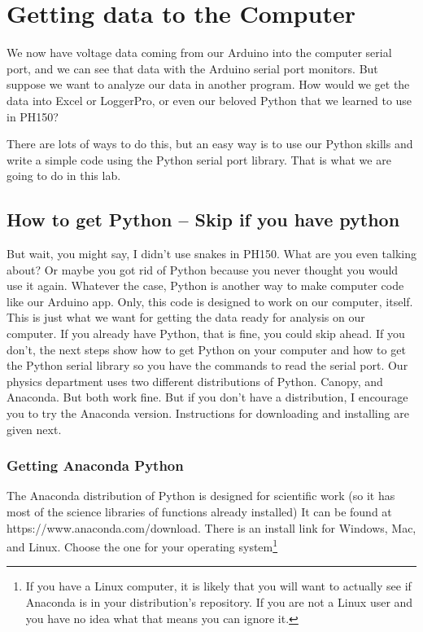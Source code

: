 \chapter{Getting data to the Computer}
We now have voltage data coming from our Arduino into the computer serial port, and we can see that data with the Arduino serial port monitors. But suppose we want to analyze our data in another program. How would we get the data into Excel or LoggerPro, or even our beloved Python that we learned to use in PH150?

There are lots of ways to do this, but an easy way is to use our Python skills and write a simple code using the Python serial port library. That is what we are going to do in this lab.

\section{How to get Python -- Skip if you have python}

But wait, you might say, I didn't use snakes in PH150. What are you even talking about? Or maybe you got rid of Python because you never thought you would use it again. Whatever the case, Python is another way to make computer code like our Arduino app. Only, this code is designed to work on our computer, itself. This is just what we want for getting the data ready for analysis on our computer. If you already have Python, that is fine, you could skip ahead. If you don't, the next steps show how to get Python on your computer and how to get the Python serial library so you have the commands to read the serial port. Our physics department uses two different distributions of Python. Canopy, and Anaconda. But both work fine. But if you don't have a distribution, I encourage you to try the Anaconda version. Instructions for downloading and installing are given next. 

\subsection{Getting Anaconda Python}

The Anaconda distribution of Python is designed for scientific work (so it has most of the science libraries of functions already installed) It can be found at https://www.anaconda.com/download. There is an install link for Windows, Mac, and Linux. Choose the one for your operating system\footnote{If you have a Linux computer, it is likely that you will want to actually see if Anaconda is in your distribution's repository. If you are not a Linux user and you have no idea what that means you can ignore it.}

